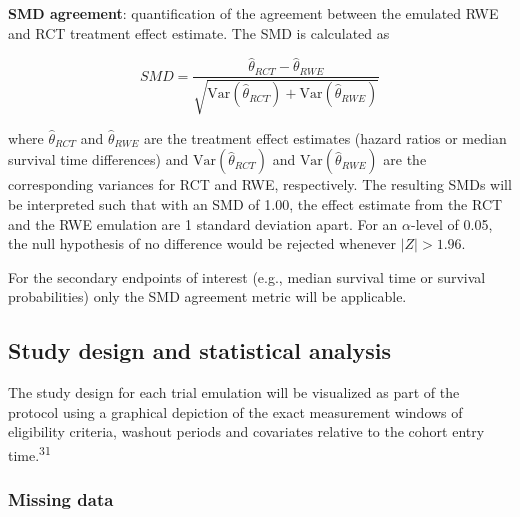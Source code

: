 \documentclass[
  letterpaper,
  DIV=11,
  numbers=noendperiod]{scrartcl}
\begin{document}
\textbf{SMD agreement}: quantification of the agreement between the
emulated RWE and RCT treatment effect estimate. The SMD is calculated as

\[
SMD = \frac{\hat{\theta}_{RCT} - \hat{\theta}_{RWE}}{\sqrt{\text{Var}(\hat{\theta}_{RCT}) + \text{Var}(\hat{\theta}_{RWE})}}
\]

where \(\hat{\theta}_{RCT}\) and \(\hat{\theta}_{RWE}\) are the
treatment effect estimates (hazard ratios or median survival time
differences) and \(\text{Var}(\hat{\theta}_{RCT})\) and
\(\text{Var}(\hat{\theta}_{RWE})\) are the corresponding variances for
RCT and RWE, respectively. The resulting SMDs will be interpreted such
that with an SMD of 1.00, the effect estimate from the RCT and the RWE
emulation are 1 standard deviation apart. For an \(\alpha\)-level of
0.05, the null hypothesis of no difference would be rejected whenever
\(|Z| > 1.96\).

For the secondary endpoints of interest (e.g., median survival time or
survival probabilities) only the SMD agreement metric will be
applicable.

\subsection{Study design and statistical
analysis}\label{study-design-and-statistical-analysis}

The study design for each trial emulation will be visualized as part of
the protocol using a graphical depiction of the exact measurement
windows of eligibility criteria, washout periods and covariates relative
to the cohort entry time.\textsuperscript{31}

\subsubsection{Missing data}\label{missing-data}
\end{document}
